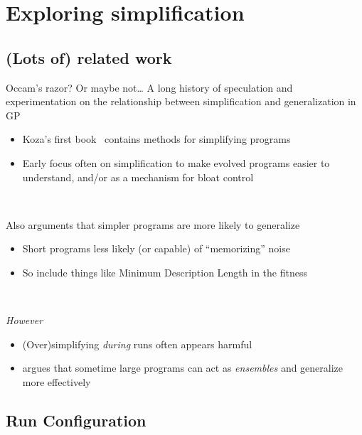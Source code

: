 \documentclass{beamer}
\begin{document}
\section{Exploring simplification}

\subsection{(Lots of) related work}

\begin{frame}{Occam's razor? Or maybe not\ldots}
A long history of speculation and experimentation on the relationship between simplification and generalization in GP
\begin{itemize}
	\item Koza's first book~\cite{} contains methods for simplifying programs
	\item Early focus often on simplification to make evolved programs easier to understand, and/or as a mechanism for bloat control
\end{itemize}

~

Also arguments that simpler programs are more likely to generalize
\begin{itemize}
	\item Short programs less likely (or capable) of ``memorizing'' noise
	\item So include things like Minimum Description Length in the fitness
\end{itemize}

~

\emph{However}
\begin{itemize}
	\item (Over)simplifying \emph{during} runs often appears harmful
	\item \cite{Goncalves} argues that sometime large programs can act as \emph{ensembles} and generalize more effectively
\end{itemize}

\end{frame}

\subsection{Run Configuration}
\end{document}
